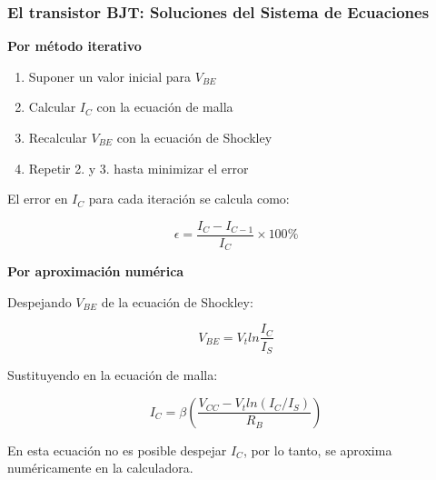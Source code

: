 \begin{frame}[t]
    \frametitle{El transistor BJT: Soluciones del Sistema de Ecuaciones}

    \begin{multicols}{2}
        \textbf{Por método iterativo}

        \begin{enumerate}
            \item Suponer un valor inicial para $V_{BE}$
            \item Calcular $I_C$ con la ecuación de malla
            \item Recalcular $V_{BE}$ con la ecuación de Shockley
            \item Repetir 2. y 3. hasta minimizar el error
        \end{enumerate}
        
        El error en $I_C$ para cada iteración se calcula como:

        \[ \epsilon = \dfrac{I_{C} - I_{C-1}}{I_C} \times 100\% \]

        \newpage
        \textbf{Por aproximación numérica}

        Despejando $V_{BE}$ de la ecuación de Shockley:

        \[ V_{BE} = V_t ln {\dfrac{I_C}{I_S}} \]

        Sustituyendo en la ecuación de malla:

        \[ I_C = \beta \left( \dfrac{V_{CC}-V_t ln (I_C/I_S)}{R_B} \right) \]

        En esta ecuación no es posible despejar $I_C$, por lo tanto, se aproxima numéricamente en la calculadora.

    \end{multicols}
\end{frame}


